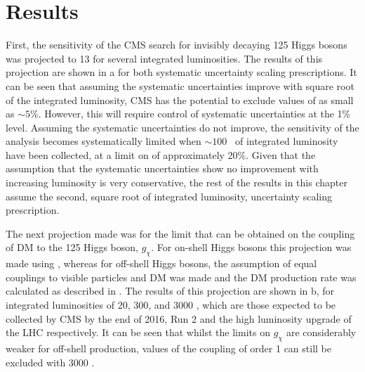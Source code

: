 \section{Results}
\label{sec:dmresults}
First, the sensitivity of the CMS search for invisibly decaying 125 \GeV Higgs bosons was projected to 13 \TeV for several integrated luminosities. The results of this projection are shown in a for both systematic uncertainty scaling prescriptions. It can be seen that assuming the systematic uncertainties improve with square root of the integrated luminosity, CMS has the potential to exclude values of \BRinv as small as $\sim 5\%$. However, this will require control of systematic uncertainties at the 1\% level. Assuming the systematic uncertainties do not improve, the sensitivity of the analysis becomes systematically limited when $\sim 100$ \invfb\, of integrated luminosity have been collected, at  a limit on \BRinv of approximately 20\%. Given that the assumption that the systematic uncertainties show no improvement with increasing luminosity is very conservative, the rest of the results in this chapter assume the second, square root of integrated luminosity, uncertainty scaling prescription.

The next projection made was for the limit that can be obtained on the coupling of \ac{DM} to the 125 \GeV Higgs boson, $g_{\chi}$. For on-shell Higgs bosons this projection was made using , whereas for off-shell Higgs bosons, the assumption of equal couplings to visible particles and \ac{DM} was made and the \ac{DM} production rate was calculated as described in . The results of this projection are shown in b, for integrated luminosities of 20, 300, and 3000 \invfb, which are those expected to be collected by CMS by the end of 2016, Run 2 and the high luminosity upgrade of the LHC respectively. It can be seen that whilst the limits on $g_{\chi}$ are considerably weaker for off-shell production, values of the coupling of order 1 can still be excluded with 3000 \invfb.

